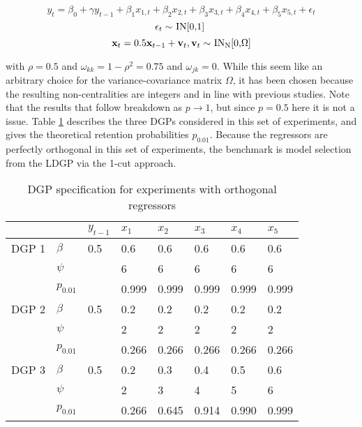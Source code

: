 \documentclass[11pt, oneside]{book}   	%
\begin{document}
$$y_{t}=\beta_{0} + \gamma y_{t-1}+\beta_{1}x_{1,t}+\beta_{2}x_{2,t}+ \beta_{3}x_{3,t}+ \beta_{4}x_{4,t}+ \beta_{5}x_{5,t} + \epsilon_{t}$$
$$\centerline{$\epsilon_{t} \sim $ IN[0,1] }$$
 $$\centerline{$\textbf{x}_{t}=0.5\textbf{x}_{t-1}+\textbf{v}_{t}, \textbf{v}_{t} \sim $ IN\textsubscript{N}[0,$\Omega$]}$$

with $\rho = 0.5$ and $\omega_{kk} = 1-\rho^{2} = 0.75$ and $\omega_{jk} = 0 $. While this seem like an arbitrary choice for the variance-covariance matrix $\Omega$, it has been chosen because the resulting non-centralities are integers and in line with previous studies. Note that the results that follow breakdown as $p\rightarrow 1$, but since $p=0.5$ here it is not a issue. Table \ref{DGPspec123} describes the three DGPs considered in this set of experiments, and gives the theoretical retention probabilities $p_{0.01}$. Because the regressors are perfectly orthogonal in this set of experiments, the benchmark is model selection from the LDGP via the 1-cut approach.  


\begin{table}[h]
\centering
\begin{tabular}{l|l|l|l|l|l|l|l}

& &$y_{t-1}$ &$x_{1}$ &$x_{2}$ &$x_{3}$ &  $x_{4}$ & $x_{5}$  \\
\hline
DGP 1 & $\beta$ & 0.5 & 0.6 &0.6 &0.6 &  0.6 & 0.6 \\

 	& $\psi$ & &6 &6 &6 &6 &6 \\
 
   & \textbf{$p_{0.01}$} & & 0.999 & 0.999 & 0.999 & 0.999 & 0.999 \\
\hline
DGP 2 & $\beta$ & 0.5 & 0.2 &0.2 &0.2 &  0.2 & 0.2 \\

 	& $\psi$ & &2 &2 &2 &2 &2 \\
       & \textbf{$p_{0.01}$} & & 0.266 & 0.266 & 0.266 & 0.266 & 0.266 \\
\hline
DGP 3 & $\beta$ & 0.5 & 0.2 &0.3 &0.4 &  0.5 & 0.6 \\

 	& $\psi$ & &2 &3 &4 &5 &6 \\
       & \textbf{$p_{0.01}$} & & 0.266 & 0.645 & 0.914 & 0.990 & 0.999 \\
    
\end{tabular}
\caption{DGP specification for experiments with orthogonal regressors}
\label{DGPspec123}
\end{table}
\end{document}
